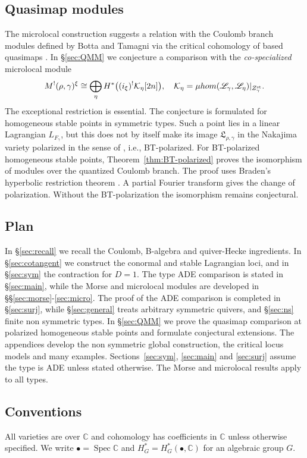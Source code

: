 \documentclass[11pt,reqno]{amsart}
\theoremstyle{definition}
\theoremstyle{remark}
\def\bbC{\mathbb C}
\def\Spec{\operatorname{Spec}}
\def\muhom{\mu hom}
\begin{document}
\subsection{Quasimap modules}
The microlocal construction suggests a relation with the
Coulomb branch modules defined by Botta and Tamagni via the
critical cohomology of based quasimaps \cite{BT26}. In
\S\ref{sec:QMM} we conjecture a comparison with the
\emph{co-specialized} microlocal module
\[
 M^!(\rho,\gamma)^\xi
 \cong\bigoplus_\eta H^*\bigl((i_\xi)^!\mathcal K_\eta[2n]\bigr),
 \quad
 \mathcal K_\eta
 =\muhom(\mathscr L_\gamma,\mathscr L_\eta)
      |_{Z_\gamma^{\rm st}}.
\]
The exceptional restriction is essential.
The conjecture is formulated for homogeneous stable points in
symmetric types. Such a point lies in a linear Lagrangian
$L_{F_\gamma}$, but this does not by itself make its image $\mathfrak L_{\rho,\gamma}$ in the
Nakajima variety polarized in the sense of \cite[\S1.3.5]{BT26}, i.e., BT-polarized.
For BT-polarized homogeneous stable points, Theorem~\ref{thm:BT-polarized}
proves the  isomorphism of modules over the quantized Coulomb branch. The
proof uses Braden's
hyperbolic restriction theorem \cite{Bra03}.
A partial Fourier transform gives the change of polarization.
 Without the BT-polarization the isomorphism
remains conjectural. 

\subsection{Plan}
In \S\ref{sec:recall} we recall the Coulomb, B-algebra and
quiver-Hecke ingredients. In \S\ref{sec:cotangent} we construct
the conormal and stable Lagrangian loci, and in
\S\ref{sec:sym} the contraction for $D=1$. The type ADE
comparison is stated in \S\ref{sec:main}, while the Morse and
microlocal modules are developed in
\S\S\ref{sec:morse}-\ref{sec:micro}. The proof of the
ADE comparison is completed in \S\ref{sec:surj}, while 
\S\ref{sec:general} treats arbitrary symmetric quivers,
and \S\ref{sec:ns} finite non symmetric types.
In \S\ref{sec:QMM} we prove the quasimap comparison at polarized
homogeneous stable points and formulate conjectural extensions. The appendices develop
the non symmetric global construction, the critical locus models and many examples. 
Sections~\ref{sec:sym}, \ref{sec:main}
and \ref{sec:surj} assume the type is ADE unless stated
otherwise. The Morse and microlocal results apply to all types.

\subsection{Conventions}
All varieties are over $\bbC$ and cohomology has coefficients in
$\bbC$ unless otherwise specified. We write
$\bullet=\Spec\bbC$ and
$H_G^*=H_G^*(\bullet,\bbC)$ for an algebraic group $G$.
\end{document}

